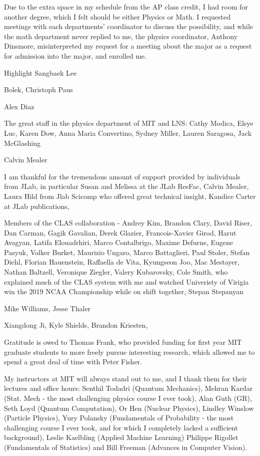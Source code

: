 Due to the extra space in my schedule from the AP class credit, I had room for another degree, which I felt should be either Physics or Math. I requested meetings with each departments' coordinator to discuss the possibility, and while the math department never replied to me, the physics  coordinator, Anthony Dinsmore, misinterpreted my request for a meeting about the major as a request for admission into the major, and enrolled me. 

Highlight Sangbaek Lee

Bolek, Christoph Paus 

Alex Diaz

The great staff in the physics department of MIT and LNS: Cathy Modica, Elsye Luc, Karen Dow, Anna Maria Convertino, Sydney Miller, Lauren Saragosa, Jack McGlashing



Calvin Mealer

I am thankful for the tremendous amount of support provided by individuals from JLab, in particular Susan and Melissa at the JLab ResFac, Calvin Mealer, Laura Hild from Jlab Scicomp who offered great technical insight, Kandice Carter at JLab publications, 

Members of the CLAS collaboration - Andrey Kim, Brandon Clary, David Riser, Dan Carman, Gagik Gavalian, Derek Glazier, Francois-Xavier Girod, Harut Avagyan, Latifa Elouadrhiri, Marco Contalbrigo, Maxime Defurne, Eugene Pasyuk, Volker Burket, Maurizio Ungaro, Marco Battaglieri, Paul Stoler, Stefan Diehl, Florian Hauenstein, Raffaella de Vita, Kyungseon Joo, Mac Mestayer, Nathan Baltzell, Veronique Ziegler, Valery Kubarovsky, Cole Smith, who explained much of the CLAS system with me and watched Univeristy of Virigia win the 2019 NCAA Championship while on shift together, Stepan Stepanyan

Mike Williams, Jesse Thaler


Xiangdong Ji, Kyle Shields, Brandon Kriesten, 

Gratitude is owed to Thomas Frank, who provided funding for first year MIT graduate students to more freely pursue interesting research, which allowed me to spend a great deal of time with Peter Fisher. 

My instructors at MIT will always stand out to me, and I thank them for their lectures and office hours: Senthil Todadri (Quantum Mechanics), Mehran Kardar (Stat. Mech - the most challenging physics course I ever took), Alan Guth (GR), Seth Loyd (Quantum Computation), Or Hen (Nuclear Physics), Lindley Winslow (Particle Physics), Yury Polansky (Fundamentals of Probability - the most challenging course I ever took, and for which I completely lacked a sufficient background), Leslie Kaelbling (Applied Machine Learning) Philippe Rigollet (Fundamentals of Statistics) and Bill Freeman (Advances in Computer Vision). 

